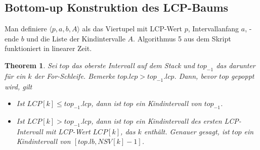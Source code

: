 \documentclass[a4paper, 12pt]{article}
\theoremstyle{plain}
\newtheorem{theorem}{Theorem}[subsection] %
\theoremstyle{definition}
\theoremstyle{lemma}
\theoremstyle{remark}
\theoremstyle{corollary}
\theoremstyle{example}
\begin{document}
	\subsection{Bottom-up Konstruktion des LCP-Baums}
	Man definiere $\langle p,a,b,A\rangle$ als das Viertupel mit LCP-Wert $p$, Intervallanfang $a$, -ende $b$ und die Liste der Kindintervalle $A$. Algorithmus 5 aus dem Skript funktioniert in linearer Zeit.
	\begin{theorem}
		Sei $top$ das oberste Intervall auf dem Stack und $top_{-1}$ das darunter für ein $k$ der For-Schleife. Bemerke $top.lcp > top_{-1}.lcp$. Dann, bevor $top$ gepoppt wird, gilt \begin{itemize}
			\item Ist $LCP[k]\leq top_{-1}.lcp$, dann ist $top$ ein Kindintervall von $top_{-1}$. 
			\item Ist $LCP[k] > top_{-1}.lcp$, dann ist $top$ ein Kindintervall des ersten LCP-Intervall mit LCP-Wert $LCP[k]$, das $k$ enthält. Genauer gesagt, ist $top$ ein Kindintervall von $[top.lb, NSV[k]-1]$.
		\end{itemize}
	\end{theorem}
\end{document}
